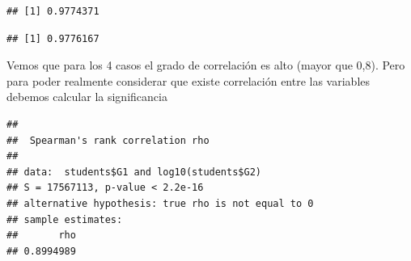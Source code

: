 \documentclass[]{article}
\newenvironment{Shaded}{\begin{snugshade}}{\end{snugshade}}
\newcommand{\CommentTok}[1]{\textcolor[rgb]{0.50,0.62,0.50}{#1}}
\newcommand{\DataTypeTok}[1]{\textcolor[rgb]{0.87,0.87,0.75}{#1}}
\newcommand{\FloatTok}[1]{\textcolor[rgb]{0.75,0.75,0.82}{#1}}
\newcommand{\KeywordTok}[1]{\textcolor[rgb]{0.94,0.87,0.69}{#1}}
\newcommand{\NormalTok}[1]{\textcolor[rgb]{0.80,0.80,0.80}{#1}}
\newcommand{\OperatorTok}[1]{\textcolor[rgb]{0.94,0.94,0.82}{#1}}
\newcommand{\StringTok}[1]{\textcolor[rgb]{0.80,0.58,0.58}{#1}}
\begin{document}
\begin{verbatim}
## [1] 0.9774371
\end{verbatim}

\begin{Shaded}
\end{Shaded}

\begin{verbatim}
## [1] 0.9776167
\end{verbatim}

Vemos que para los 4 casos el grado de correlación es alto (mayor que
0,8). Pero para poder realmente considerar que existe correlación entre
las variables debemos calcular la significancia

\begin{Shaded}
\end{Shaded}

\begin{verbatim}
## 
##  Spearman's rank correlation rho
## 
## data:  students$G1 and log10(students$G2)
## S = 17567113, p-value < 2.2e-16
## alternative hypothesis: true rho is not equal to 0
## sample estimates:
##       rho 
## 0.8994989
\end{verbatim}

\begin{Shaded}
\end{Shaded}
\end{document}
